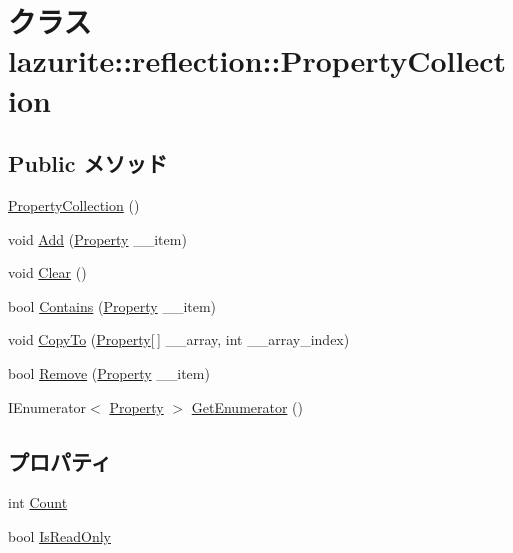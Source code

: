\hypertarget{classlazurite_1_1reflection_1_1_property_collection}{
\section{クラス lazurite::reflection::PropertyCollection}
\label{classlazurite_1_1reflection_1_1_property_collection}
}
\subsection*{Public メソッド}
\begin{DoxyCompactItemize}
\item 
\hyperlink{classlazurite_1_1reflection_1_1_property_collection_aa0ec008f56b1fefae374c8b215bad9b0}{PropertyCollection} ()
\item 
void \hyperlink{classlazurite_1_1reflection_1_1_property_collection_a6f5ed0aab0460c7ff49aef432f856da3}{Add} (\hyperlink{classlazurite_1_1reflection_1_1_property}{Property} \_\-\_\-item)
\item 
void \hyperlink{classlazurite_1_1reflection_1_1_property_collection_a013246552bc274658665ddd312652ea4}{Clear} ()
\item 
bool \hyperlink{classlazurite_1_1reflection_1_1_property_collection_a596aa4dc6e321203777ad16d4ecd6eda}{Contains} (\hyperlink{classlazurite_1_1reflection_1_1_property}{Property} \_\-\_\-item)
\item 
void \hyperlink{classlazurite_1_1reflection_1_1_property_collection_a7f0f59d9949dc008da698cd2d6fc0790}{CopyTo} (\hyperlink{classlazurite_1_1reflection_1_1_property}{Property}\mbox{[}$\,$\mbox{]} \_\-\_\-array, int \_\-\_\-array\_\-index)
\item 
bool \hyperlink{classlazurite_1_1reflection_1_1_property_collection_aa0448533496f20b5567079b84e8d6094}{Remove} (\hyperlink{classlazurite_1_1reflection_1_1_property}{Property} \_\-\_\-item)
\item 
IEnumerator$<$ \hyperlink{classlazurite_1_1reflection_1_1_property}{Property} $>$ \hyperlink{classlazurite_1_1reflection_1_1_property_collection_aa7a45429917cca9bcab939b275138831}{GetEnumerator} ()
\end{DoxyCompactItemize}
\subsection*{プロパティ}
\begin{DoxyCompactItemize}
\item 
int \hyperlink{classlazurite_1_1reflection_1_1_property_collection_a7fdcbe4737dac05111d6c07fe79fd1ce}{Count}
\item 
bool \hyperlink{classlazurite_1_1reflection_1_1_property_collection_a55aafcc1d4d4ab210670101179b4d7f6}{IsReadOnly}
\end{DoxyCompactItemize}


